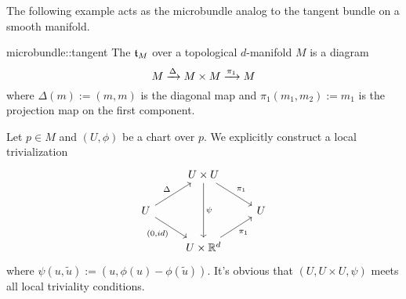 \begin{myparagraph}
    The following example acts as the microbundle analog to the tangent bundle on a smooth manifold.
\end{myparagraph}

\begin{myexample}{microbundle::tangent}
    The  $\mathfrak{t}_M$ over a topological $d$-manifold $M$ is a diagram
    \[ M \xrightarrow{\Delta} M \times M \xrightarrow{\pi_1} M{} \]
    where $\Delta(m) := (m, m)$ is the diagonal map and $\pi_1(m_1, m_2) := m_1$ is the projection map on the first component.
    \begin{myproof}
        Let $p \in M$ and $(U, \phi)$ be a chart over $p$.
        We explicitly construct a local trivialization
        \[\begin{tikzcd}
            & U \times U \ar[dr, "\pi_1"] \ar[dd, "{\psi}"] & \\
            U \ar[ur, "\Delta"] \ar[dr, "{(0, id)}"'] & & U \\
            & U \times \R^d \ar[ur, "\pi_1"'] &
        \end{tikzcd}\]
        where $\psi(u, \tilde{u}) := (u, \phi(u) - \phi(\tilde{u}))$.
        It's obvious that $(U, U \times U, \psi)$ meets all local triviality conditions.
    \end{myproof}
\end{myexample}